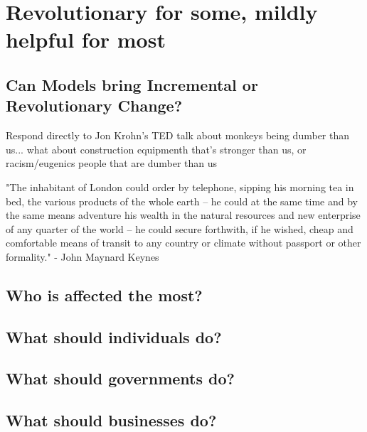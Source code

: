 \setchapterpreamble[u]{\margintoc}
\chapter{Revolutionary for some, mildly helpful for most}


\section{Can Models bring Incremental or Revolutionary Change?}

Respond directly to Jon Krohn's TED talk about monkeys being dumber than us... what about construction equipmenth that's stronger than us, or racism/eugenics people that are dumber than us 

"The inhabitant of London could order by telephone, sipping his morning tea in bed, the various products of the whole earth -- he could at the same time and by the same means adventure his wealth in the natural resources and new enterprise of any quarter of the world -- he could secure forthwith, if he wished, cheap and comfortable means of transit to any country or climate without passport or other formality." - John Maynard Keynes 

\section{Who is affected the most?}

\section{What should individuals do?}

\section{What should governments do?}

\section{What should businesses do?}
